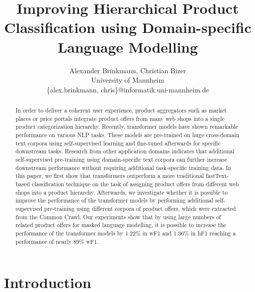 \documentclass[11pt,dvipdfm]{article}
\begin{document}
\graphicspath{{alexanderbrinkmann/}}

\title{Improving Hierarchical Product Classification using Domain-specific Language Modelling}

\author{
  Alexander Brinkmann, Christian Bizer\\
  University of Mannheim\\
  \{alex.brinkmann, chris\}@informatik.uni-mannheim.de
}

\maketitle

\begin{abstract}
In order to deliver a coherent user experience, product aggregators such as market places or price portals integrate product offers from many web shops into a single product categorization hierarchy. 
Recently, transformer models have shown remarkable performance on various NLP tasks.
These models are pre-trained on huge cross-domain text corpora using self-supervised learning and fine-tuned afterwards for specific downstream tasks. 
Research from other application domains indicates that additional self-supervised pre-training using domain-specific text corpora can further increase downstream performance without requiring additional task-specific training data.
In this paper, we first show that transformers outperform a more traditional fastText-based classification technique on the task of assigning product offers from different web shops into a product hierarchy.
Afterwards, we investigate whether it is possible to improve the performance of the transformer models by performing additional self-supervised pre-training using different corpora of product offers, which were extracted from the Common Crawl.  
Our experiments show that by using large numbers of related product offers for masked language modelling, it is possible to increase the performance of the transformer models by 1.22\% in wF1 and 1.36\% in hF1 reaching a performance of nearly 89\% wF1.
\end{abstract}


\section{Introduction}
\end{document}

